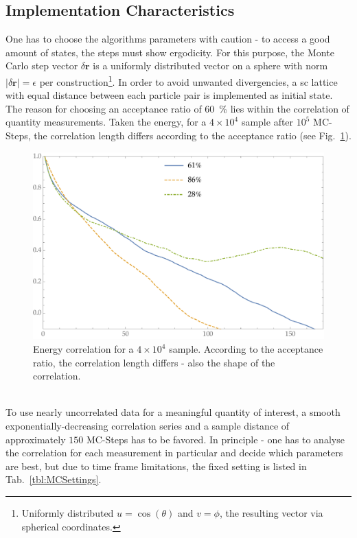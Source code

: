 \subsection{Implementation Characteristics}
One has to choose the algorithms parameters with caution - to access a good amount of states, the steps must show ergodicity.
For this purpose, the Monte Carlo step vector $\delta \bm r$ is a uniformly distributed vector on a sphere with norm $\left|\delta\bm r\right| = \epsilon$ per construction\footnote{Uniformly distributed $u=\cos(\theta)$ and $v=\phi$, the resulting vector via spherical coordinates.}.
In order to avoid unwanted divergencies, a sc lattice with equal distance between each particle pair is implemented as initial state.
The reason for choosing an acceptance ratio of \SI{60}{\percent} lies within the correlation of quantity measurements.
Taken the energy, for a $4\times10^4$ sample after $10^5$ MC-Steps, the correlation length differs according to the acceptance ratio (see Fig.~\ref{fig:MCCorrSeries}).
\begin{figure}[ht]
	\includegraphics[width=\textwidth]{Figures/MCEnergyCorrelations.pdf}
	\caption[MC: Energy Correlation Series]{Energy correlation for a $4\times10^4$ sample. According to the acceptance ratio, the correlation length differs - also the shape of the correlation.}
	\label{fig:MCCorrSeries}
\end{figure}\\
To use nearly uncorrelated data for a meaningful quantity of interest, a smooth exponentially-decreasing correlation series and a sample distance of approximately $150$ MC-Steps has to be favored.
In principle - one has to analyse the correlation for each measurement in particular and decide which parameters are best, but due to time frame limitations, the fixed setting is listed in Tab.~\ref{tbl:MCSettings}.

